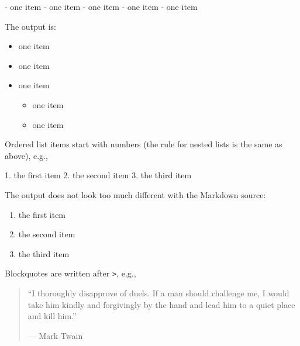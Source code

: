 \documentclass[]{article}
\newenvironment{Shaded}{\begin{snugshade}}{\end{snugshade}}
\newcommand{\FloatTok}[1]{\textcolor[rgb]{0.00,0.00,0.81}{#1}}
\newcommand{\NormalTok}[1]{#1}
\providecommand{\tightlist}{%
  \setlength{\itemsep}{0pt}\setlength{\parskip}{0pt}}
\begin{document}
\begin{Shaded}
\begin{Highlighting}[]
\NormalTok{- }\FloatTok{one item}
\FloatTok{- one item}
\FloatTok{- one item}
\FloatTok{    - one item}
\FloatTok{    - one item}
\end{Highlighting}
\end{Shaded}

The output is:

\begin{itemize}
\tightlist
\item
  one item
\item
  one item
\item
  one item

  \begin{itemize}
  \tightlist
  \item
    one item
  \item
    one item
  \end{itemize}
\end{itemize}

Ordered list items start with numbers (the rule for nested lists is the
same as above), e.g.,

\begin{Shaded}
\begin{Highlighting}[]
\NormalTok{1. }\FloatTok{the first item}
\FloatTok{2. the second item}
\FloatTok{3. the third item}
\end{Highlighting}
\end{Shaded}

The output does not look too much different with the Markdown source:

\begin{enumerate}
\def\labelenumi{\arabic{enumi}.}
\tightlist
\item
  the first item
\item
  the second item
\item
  the third item
\end{enumerate}

Blockquotes are written after \texttt{\textgreater{}}, e.g.,

\begin{quote}
``I thoroughly disapprove of duels. If a man should challenge me, I
would take him kindly and forgivingly by the hand and lead him to a
quiet place and kill him.''

\begin{flushright}--- Mark Twain\end{flushright}
\end{quote}
\end{document}

